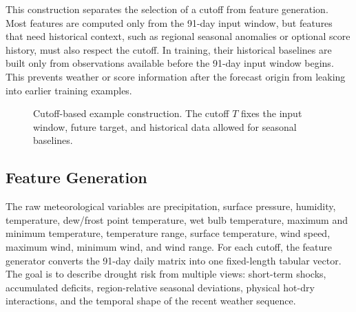 \documentclass[conference]{IEEEtran}
\begin{document}
This construction separates the selection of a cutoff from feature generation.
Most features are computed only from the 91-day input window, but features that
need historical context, such as regional seasonal anomalies or optional score
history, must also respect the cutoff. In training, their historical baselines
are built only from observations available before the 91-day input window begins.
This prevents weather or score information after the forecast origin from
leaking into earlier training examples.

\begin{figure}[t]
\centering
{}
\caption{Cutoff-based example construction. The cutoff $T$ fixes the input
window, future target, and historical data allowed for seasonal baselines.}
\label{fig:cutoff}
\end{figure}

\subsection{Feature Generation}

The raw meteorological variables are precipitation, surface pressure, humidity,
temperature, dew/frost point temperature, wet bulb temperature, maximum and
minimum temperature, temperature range, surface temperature, wind speed, maximum
wind, minimum wind, and wind range. For each cutoff, the feature generator
converts the 91-day daily matrix into one fixed-length tabular vector. The goal
is to describe drought risk from multiple views: short-term shocks, accumulated
deficits, region-relative seasonal deviations, physical hot-dry interactions,
and the temporal shape of the recent weather sequence.
\end{document}
